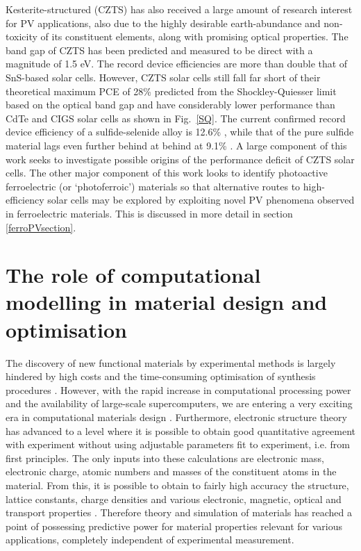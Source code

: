 \documentclass[11pt, twoside]{report}
\begin{document}
Kesterite-structured {\CZTS} (CZTS) has also received a large amount of research interest for PV applications, also due to the highly desirable earth-abundance and non-toxicity of its constituent elements, along with promising optical properties. The band gap of CZTS has been predicted \cite{CZTS_bandgap_theory} and measured \cite{CZTS_bandgap_exp} to be direct with a magnitude of 1.5 eV. 
The record device efficiencies are more than double that of SnS-based solar cells. However, CZTS solar cells still fall far short of their theoretical maximum PCE of 28\% predicted from the Shockley-Quiesser limit based on the optical band gap and have considerably lower performance than CdTe and CIGS solar cells as shown in Fig.~\ref{SQ}. The current confirmed record device efficiency of a sulfide-selenide alloy is 12.6\% \cite{Mitzi2017_rev_21}, while that of the pure sulfide material lags even further behind at behind at 9.1\% \cite{CZTS_record}. A large component of this work seeks to investigate possible origins of the performance deficit of CZTS solar cells. The other major component of this work looks to identify photoactive ferroelectric (or `photoferroic') materials so that alternative routes to high-efficiency solar cells may be explored by exploiting novel PV phenomena observed in ferroelectric materials. This is discussed in more detail in section \ref{ferroPVsection}. 


\section{The role of computational modelling in material design and optimisation}
The discovery of new functional materials by experimental methods is largely hindered by high costs and the time-consuming optimisation of synthesis procedures \cite{high_tp}.
However, with the rapid increase in computational processing power and the availability of large-scale supercomputers, we are entering a very exciting era in computational materials design \cite{WMD_material_design_review}. Furthermore, electronic structure theory has advanced to a level where it is possible to obtain good quantitative agreement with experiment without using adjustable parameters fit to experiment, i.e. from first principles. The only inputs into these calculations are electronic mass, electronic charge, atomic numbers and masses of the constituent atoms in the material. From this, it is possible to obtain to fairly high accuracy the structure, lattice constants, charge densities and various electronic, magnetic, optical and transport properties \cite{RichardMartin_Ch1}. Therefore theory and simulation of materials has reached a point of possessing predictive power for material properties relevant for various applications, completely independent of experimental measurement.
\end{document}
